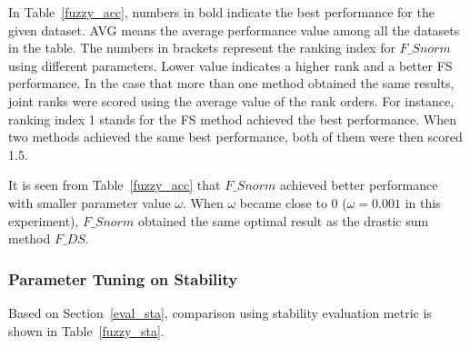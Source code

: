 \documentclass[conference]{IEEEtran}
\begin{document}
In Table~\ref{fuzzy_acc}, numbers in bold indicate the best performance for the given dataset. AVG means the average performance value among all the datasets in the table. The numbers in brackets represent the ranking index for $F\_{Snorm}$ using different parameters. Lower value indicates a higher rank and a better FS performance. In the case that more than one method obtained the same results, joint ranks were scored using the average value of the rank orders. For instance, ranking index 1 stands for the FS method achieved the best performance. When two methods achieved the same best performance, both of them were then scored 1.5.

It is seen from Table~\ref{fuzzy_acc} that $F\_{Snorm}$ achieved better performance with smaller parameter value $\omega$. When $\omega$ became close to 0 ($\omega = 0.001$ in this experiment), $F\_{Snorm}$ obtained the same optimal result as the drastic sum method $F\_{DS}$.


\subsubsection{\textbf{Parameter Tuning on Stability}}
Based on Section~\ref{eval_sta}, comparison using stability evaluation metric is shown in Table~\ref{fuzzy_sta}.
\end{document}

